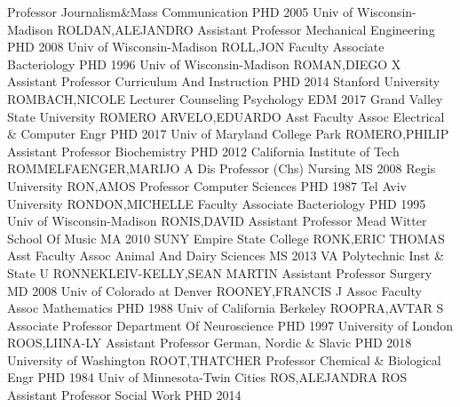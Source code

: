 \documentclass[
]{article}
\begin{document}
\textbar Professor \textbar{}  \textbar Journalism\&Mass
Communication \textbar PHD 2005 Univ of Wisconsin-Madison
\textbar ROLDAN,ALEJANDRO \textbar Assistant Professor \textbar{}
 \textbar Mechanical Engineering \textbar PHD 2008 Univ of
Wisconsin-Madison \textbar ROLL,JON \textbar Faculty Associate
\textbar{}  \textbar Bacteriology \textbar PHD 1996 Univ of
Wisconsin-Madison \textbar ROMAN,DIEGO X \textbar Assistant Professor
\textbar{}  \textbar Curriculum And Instruction \textbar PHD
2014 Stanford University \textbar ROMBACH,NICOLE \textbar Lecturer
\textbar{}  \textbar Counseling Psychology \textbar EDM 2017
Grand Valley State University \textbar ROMERO ARVELO,EDUARDO
\textbar Asst Faculty Assoc \textbar{}  \textbar Electrical
\& Computer Engr \textbar PHD 2017 Univ of Maryland College Park
\textbar ROMERO,PHILIP \textbar Assistant Professor \textbar{}
 \textbar Biochemistry \textbar PHD 2012 California
Institute of Tech \textbar ROMMELFAENGER,MARIJO A \textbar Dis Professor
(Chs) \textbar{}  \textbar Nursing \textbar MS 2008 Regis
University \textbar RON,AMOS \textbar Professor \textbar{} 
\textbar Computer Sciences \textbar PHD 1987 Tel Aviv University
\textbar RONDON,MICHELLE \textbar Faculty Associate \textbar{}
 \textbar Bacteriology \textbar PHD 1995 Univ of
Wisconsin-Madison \textbar RONIS,DAVID \textbar Assistant Professor
\textbar{}  \textbar Mead Witter School Of Music \textbar MA
2010 SUNY Empire State College \textbar RONK,ERIC THOMAS \textbar Asst
Faculty Assoc \textbar{}  \textbar Animal And Dairy Sciences
\textbar MS 2013 VA Polytechnic Inst \& State U
\textbar RONNEKLEIV-KELLY,SEAN MARTIN \textbar Assistant Professor
\textbar{}  \textbar Surgery \textbar MD 2008 Univ of
Colorado at Denver \textbar ROONEY,FRANCIS J \textbar Assoc Faculty
Assoc \textbar{}  \textbar Mathematics \textbar PHD 1988
Univ of California Berkeley \textbar ROOPRA,AVTAR S \textbar Associate
Professor \textbar{}  \textbar Department Of Neuroscience
\textbar PHD 1997 University of London \textbar ROOS,LIINA-LY
\textbar Assistant Professor \textbar{}  \textbar German,
Nordic \& Slavic \textbar PHD 2018 University of Washington
\textbar ROOT,THATCHER \textbar Professor \textbar{} 
\textbar Chemical \& Biological Engr \textbar PHD 1984 Univ of
Minnesota-Twin Cities \textbar ROS,ALEJANDRA ROS \textbar Assistant
Professor \textbar{}  \textbar Social Work \textbar PHD 2014
\end{document}
